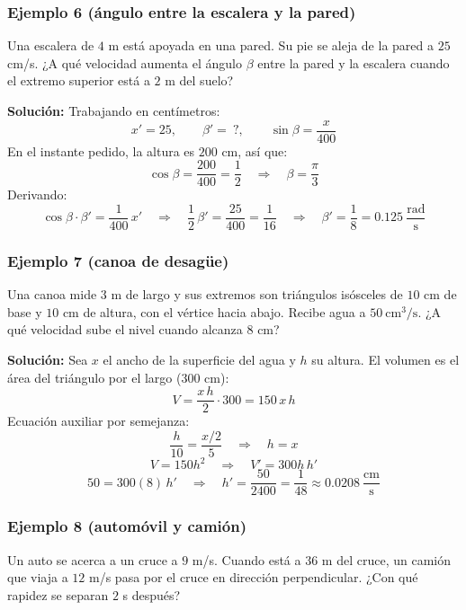 \documentclass[12pt]{article}
\begin{document}
\subsubsection{Ejemplo 6 (ángulo entre la escalera y la pared)}


Una escalera de $4$ m está apoyada en una pared. Su pie se aleja de la pared a $25$ cm/s. ¿A qué velocidad aumenta el ángulo $\beta$ entre la pared y la escalera cuando el extremo superior está a $2$ m del suelo?

\textbf{Solución:} Trabajando en centímetros:
\[
x' = 25, \qquad \beta' = \ ?, \qquad \sin\beta = \frac{x}{400}
\]
En el instante pedido, la altura es $200$ cm, así que:
\[
\cos\beta = \frac{200}{400} = \frac{1}{2} \quad \Rightarrow \quad \beta = \frac{\pi}{3}
\]
Derivando:
\[
\cos\beta \cdot \beta' = \frac{1}{400} \, x' \quad \Rightarrow \quad \frac{1}{2}\,\beta' = \frac{25}{400} = \frac{1}{16} \quad \Rightarrow \quad \beta' = \frac{1}{8} = 0.125\ \frac{\text{rad}}{\text{s}}
\]



\subsubsection{Ejemplo 7 (canoa de desagüe)}


Una canoa mide $3$ m de largo y sus extremos son triángulos isósceles de $10$ cm de base y $10$ cm de altura, con el vértice hacia abajo. Recibe agua a $50\ \text{cm}^3/\text{s}$. ¿A qué velocidad sube el nivel cuando alcanza $8$ cm?

\textbf{Solución:} Sea $x$ el ancho de la superficie del agua y $h$ su altura. El volumen es el área del triángulo por el largo ($300$ cm):
\[
V = \frac{x\,h}{2} \cdot 300 = 150\,x\,h
\]
Ecuación auxiliar por semejanza:
\[
\frac{h}{10} = \frac{x/2}{5} \quad \Rightarrow \quad h = x
\]
\[
V = 150h^2 \quad \Rightarrow \quad V' = 300h \, h'
\]
\[
50 = 300(8)\,h' \quad \Rightarrow \quad h' = \frac{50}{2400} = \frac{1}{48} \approx 0.0208\ \frac{\text{cm}}{\text{s}}
\]



\subsubsection{Ejemplo 8 (automóvil y camión)}


Un auto se acerca a un cruce a $9$ m/s. Cuando está a $36$ m del cruce, un camión que viaja a $12$ m/s pasa por el cruce en dirección perpendicular. ¿Con qué rapidez se separan $2$ s después?
\end{document}
